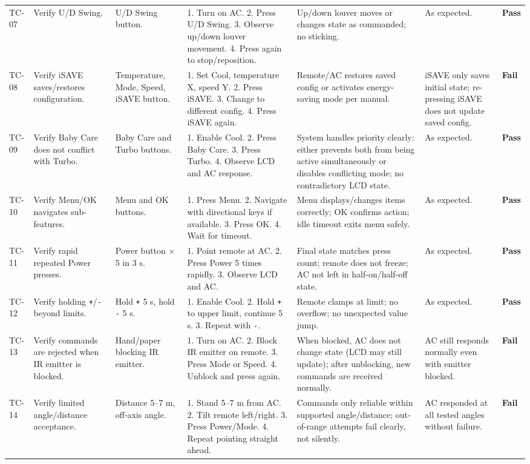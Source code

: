 \documentclass[12pt, a4paper]{article}
\newcommand{\vpass}{\textcolor{PassGreen}{\textbf{Pass}}}
\newcommand{\vfail}{\textcolor{FailRed}{\textbf{Fail}}}
\begin{document}
{\begin{longtable}{@{} C{1cm} L{2.5cm} L{1.8cm} L{3cm} L{2.8cm} L{1.8cm} C{1cm} @{}}
TC-07 & Verify U/D Swing. & U/D Swing button. & 1. Turn on AC. 2. Press U/D Swing. 3. Observe up/down louver movement. 4. Press again to stop/reposition. & Up/down louver moves or changes state as commanded; no sticking. & As expected. & \vpass \\
TC-08 & Verify iSAVE saves/restores configuration. & Temperature, Mode, Speed, iSAVE button. & 1. Set Cool, temperature X, speed Y. 2. Press iSAVE. 3. Change to different config. 4. Press iSAVE again. & Remote/AC restores saved config or activates energy-saving mode per manual. & iSAVE only saves initial state; re-pressing iSAVE does not update saved config. & \vfail \\
TC-09 & Verify Baby Care does not conflict with Turbo. & Baby Care and Turbo buttons. & 1. Enable Cool. 2. Press Baby Care. 3. Press Turbo. 4. Observe LCD and AC response. & System handles priority clearly: either prevents both from being active simultaneously or disables conflicting mode; no contradictory LCD state. & As expected. & \vpass \\
TC-10 & Verify Menu/OK navigates sub-features. & Menu and OK buttons. & 1. Press Menu. 2. Navigate with directional keys if available. 3. Press OK. 4. Wait for timeout. & Menu displays/changes items correctly; OK confirms action; idle timeout exits menu safely. & As expected. & \vpass \\
TC-11 & Verify rapid repeated Power presses. & Power button $\times$5 in 3 s. & 1. Point remote at AC. 2. Press Power 5 times rapidly. 3. Observe LCD and AC. & Final state matches press count; remote does not freeze; AC not left in half-on/half-off state. & As expected. & \vpass \\
TC-12 & Verify holding \texttt{+}/\texttt{-} beyond limits. & Hold \texttt{+} 5 s, hold \texttt{-} 5 s. & 1. Enable Cool. 2. Hold \texttt{+} to upper limit, continue 5 s. 3. Repeat with \texttt{-}. & Remote clamps at limit; no overflow; no unexpected value jump. & As expected. & \vpass \\
TC-13 & Verify commands are rejected when IR emitter is blocked. & Hand/paper blocking IR emitter. & 1. Turn on AC. 2. Block IR emitter on remote. 3. Press Mode or Speed. 4. Unblock and press again. & When blocked, AC does not change state (LCD may still update); after unblocking, new commands are received normally. & AC still responds normally even with emitter blocked. & \vfail \\
TC-14 & Verify limited angle/distance acceptance. & Distance 5--7 m, off-axis angle. & 1. Stand 5--7 m from AC. 2. Tilt remote left/right. 3. Press Power/Mode. 4. Repeat pointing straight ahead. & Commands only reliable within supported angle/distance; out-of-range attempts fail clearly, not silently. & AC responded at all tested angles without failure. & \vfail \\

\end{longtable}}
\end{document}
